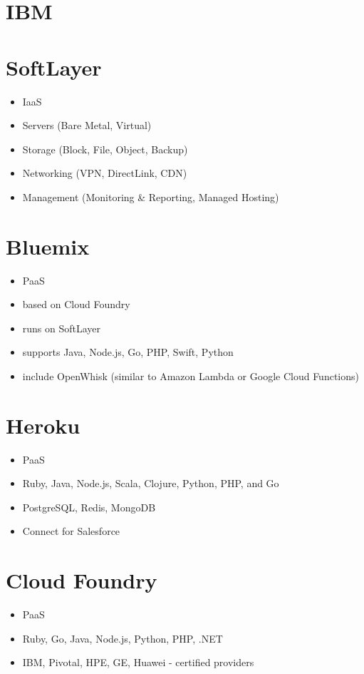 \documentclass[presentation]{beamer}
\begin{document}
\section*{IBM}
\label{sec:org75aa9a6}
\section*{SoftLayer}
\label{sec:org23dc449}
\begin{itemize}
\item IaaS
\item Servers (Bare Metal, Virtual)
\item Storage (Block, File, Object, Backup)
\item Networking (VPN, DirectLink, CDN)
\item Management (Monitoring \& Reporting, Managed Hosting)
\end{itemize}
\section*{Bluemix}
\label{sec:org98fc0b0}
\begin{itemize}
\item PaaS
\item based on Cloud Foundry
\item runs on SoftLayer
\item supports Java, Node.js, Go, PHP, Swift, Python
\item include OpenWhisk (similar to Amazon Lambda or Google Cloud Functions)
\end{itemize}
\section*{Heroku}
\label{sec:org4273c49}
\begin{itemize}
\item PaaS
\item Ruby, Java, Node.js, Scala, Clojure, Python, PHP, and Go
\item PostgreSQL, Redis, MongoDB
\item Connect for Salesforce
\end{itemize}
\section*{Cloud Foundry}
\label{sec:org1249fb9}
\begin{itemize}
\item PaaS
\item Ruby, Go, Java, Node.js, Python, PHP, .NET
\item IBM, Pivotal, HPE, GE, Huawei - certified providers
\end{itemize}
\end{document}
